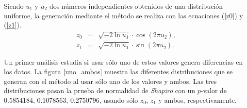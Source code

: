 \documentclass[12pt]{article}
\begin{document}
	Siendo $u_1$ y $u_2$ dos números independientes obtenidos de una distribución uniforme, la generación mediante el método se realiza con las ecuaciones (\ref{z0}) y (\ref{z1}).
	\begin{eqnarray}
	z_0 &=& \sqrt{-2 \ln u_1} \cdot \cos(2\pi u_2), \label{z0} \\
	z_1 &=& \sqrt{-2 \ln u_1} \cdot \sin(2\pi u_2). \label{z1}
	\end{eqnarray} 

	Un primer análisis estudia si usar sólo uno de estos valores genera diferencias en los datos. La figura \ref{uno_ambos} muestra las diferentes distribuciones que se generan con el método al usar sólo uno de los valores y ambos. Las tres distribuciones pasan la prueba de normalidad de {\em Shapiro} con un $p$-valor de 0.5854184, 0.1078563, 0.2750796, usando sólo $z_0$, $z_1$ y ambos, respectivamente.
	
\end{document}
